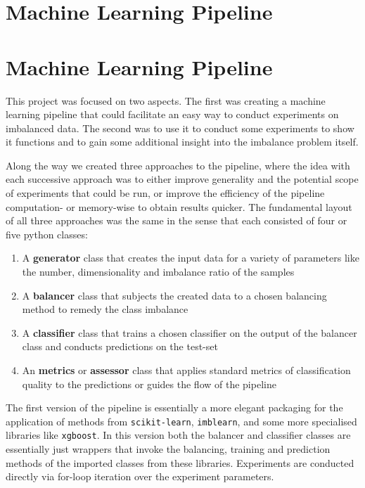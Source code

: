 \section{Machine Learning Pipeline}


\section{Machine Learning Pipeline}

This project was focused on two aspects.
The first was creating a machine learning pipeline that could facilitate an easy way to conduct experiments on imbalanced data.
The second was to use it to conduct some experiments to show it functions and to gain some additional insight into the imbalance problem itself.

Along the way we created three approaches to the pipeline, 
where the idea with each successive approach was to either improve generality and the potential scope of experiments that could be run,
or improve the efficiency of the pipeline computation- or memory-wise to obtain results quicker.
The fundamental layout of all three approaches was the same in the sense that each consisted of four or five python classes:
\begin{enumerate}[label=\arabic*)]
\item A \textbf{generator} class that creates the input data for a variety of parameters like the number, dimensionality and imbalance ratio of the samples
\item A \textbf{balancer} class that subjects the created data to a chosen balancing method to remedy the class imbalance
\item A \textbf{classifier} class that trains a chosen classifier on the output of the balancer class and conducts predictions on the test-set
\item An \textbf{metrics} or \textbf{assessor} class that applies standard metrics of classification quality to the predictions or guides the flow of the pipeline
\end{enumerate}

The first version of the pipeline is essentially a more elegant packaging for the application of methods from \texttt{scikit-learn}, \texttt{imblearn}, 
and some more specialised libraries like \texttt{xgboost}. 
In this version both the balancer and classifier classes are essentially just wrappers that invoke the balancing, 
training and prediction methods of the imported classes from these libraries.
Experiments are conducted directly via for-loop iteration over the experiment parameters.

